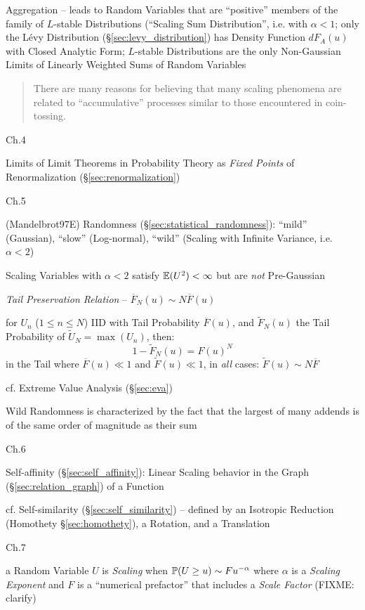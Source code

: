 Aggregation -- leads to Random Variables that are ``positive'' members of the
family of $L$-stable Distributions (``Scaling Sum Distribution'', i.e. with
$\alpha < 1$; only the L\'evy Distribution (\S\ref{sec:levy_distribution}) has
Density Function $dF_A(u)$ with Closed Analytic Form; $L$-stable Distributions
are the only Non-Gaussian Limits of Linearly Weighted Sums of Random Variables

\begin{quote}
  There are many reasons for believing that many scaling phenomena are related
  to ``accumulative'' processes similar to those encountered in coin-tossing.
\end{quote}

Ch.4

Limits of Limit Theorems in Probability Theory as \emph{Fixed
  Points} of Renormalization (\S\ref{sec:renormalization})

Ch.5

(Mandelbrot97E) Randomness (\S\ref{sec:statistical_randomness}): ``mild''
(Gaussian), ``slow'' (Log-normal), ``wild'' (Scaling with Infinite Variance,
i.e. $\alpha < 2$)

Scaling Variables with $\alpha < 2$ satisfy $\mathbb{E}(U^2) < \infty$ but are
\emph{not} Pre-Gaussian

\emph{Tail Preservation Relation} -- $\overline{F}_N(u) \sim N \overline{F}(u)$

for $U_n$ ($1 \leq n \leq N$) IID with Tail Probability $\overline{F}(u)$, and
$\tilde{F}_N(u)$ the Tail Probability of $\tilde{U}_N = \max(U_n)$, then:
\[
  1 - \tilde{F}_N(u) = F(u)^N
\]
in the Tail where $\overline{F}(u) \ll 1$ and $\tilde{F}(u) \ll 1$, in
\emph{all} cases: $\tilde{F}(u) \sim N \overline{F}$

cf. Extreme Value Analysis (\S\ref{sec:eva})

Wild Randomness is characterized by the fact that the largest of many addends is
of the same order of magnitude as their sum

Ch.6

Self-affinity (\S\ref{sec:self_affinity}): Linear Scaling behavior in the Graph
(\S\ref{sec:relation_graph}) of a Function

cf. Self-similarity (\S\ref{sec:self_similarity}) -- defined by an Isotropic
Reduction (Homothety \S\ref{sec:homothety}), a Rotation, and a Translation

Ch.7

a Random Variable $U$ is \emph{Scaling} when $\mathbb{P}(U \geq u) \sim Fu^{-\alpha}$
where $\alpha$ is a \emph{Scaling Exponent} and $F$ is a ``numerical prefactor''
that includes a \emph{Scale Factor} (FIXME: clarify)


